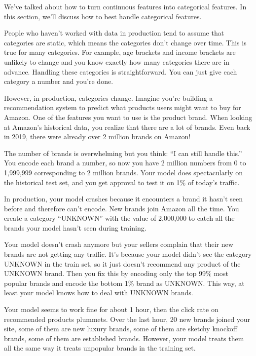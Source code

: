\documentclass[openany]{book}
\begin{document}
We’ve talked about how to turn continuous features into categorical features. In this section, we’ll discuss how to best handle categorical features.

People who haven’t worked with data in production tend to assume that categories are static, which means the categories don’t change over time. This is true for many categories. For example, age brackets and income brackets are unlikely to change and you know exactly how many categories there are in advance. Handling these categories is straightforward. You can just give each category a number and you’re done.

However, in production, categories change. Imagine you’re building a recommendation system to predict what products users might want to buy for Amazon. One of the features you want to use is the product brand. When looking at Amazon’s historical data, you realize that there are a lot of brands. Even back in 2019, there were already over 2 million brands on Amazon!

The number of brands is overwhelming but you think: “I can still handle this.” You encode each brand a number, so now you have 2 million numbers from 0 to 1,999,999 corresponding to 2 million brands. Your model does spectacularly on the historical test set, and you get approval to test it on 1\% of today’s traffic.

In production, your model crashes because it encounters a brand it hasn’t seen before and therefore can’t encode. New brands join Amazon all the time. You create a category “UNKNOWN” with the value of 2,000,000 to catch all the brands your model hasn’t seen during training.

Your model doesn’t crash anymore but your sellers complain that their new brands are not getting any traffic. It’s because your model didn’t see the category UNKNOWN in the train set, so it just doesn’t recommend any product of the UNKNOWN brand. Then you fix this by encoding only the top 99\% most popular brands and encode the bottom 1\% brand as UNKNOWN. This way, at least your model knows how to deal with UNKNOWN brands.

Your model seems to work fine for about 1 hour, then the click rate on recommended products plummets. Over the last hour, 20 new brands joined your site, some of them are new luxury brands, some of them are sketchy knockoff brands, some of them are established brands. However, your model treats them all the same way it treats unpopular brands in the training set.
\end{document}
